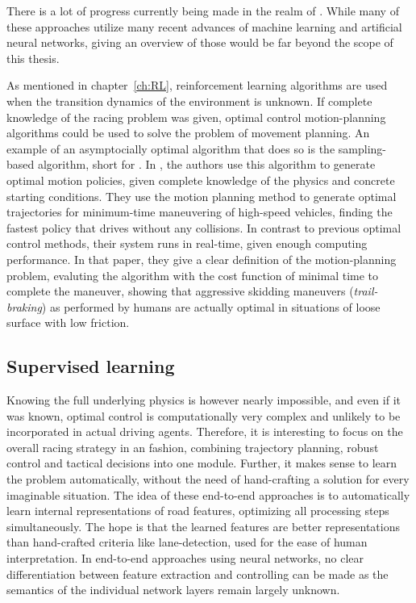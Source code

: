 There is a lot of progress currently being made in the realm of . While many of these approaches utilize many recent advances of machine learning and artificial neural networks, giving an overview of those would be far beyond the scope of this thesis.

As mentioned in chapter~\ref{ch:RL}, reinforcement learning algorithms are used when the transition dynamics of the environment is unknown. If complete knowledge of the racing problem was given, optimal control motion-planning algorithms could be used to solve the problem of movement planning. An example of an asymptocially optimal algorithm that does so is the sampling-based  algorithm, short for . In \cite{hwan_jeon_anytime_2011}, the authors use this algorithm to generate optimal motion policies, given complete knowledge of the physics and concrete starting conditions. They use the motion planning method to generate optimal trajectories for minimum-time maneuvering of high-speed vehicles, finding the fastest policy that drives without any collisions. In contrast to previous optimal control methods, their system runs in real-time, given enough computing performance. In that paper, they give a clear definition of the motion-planning problem, evaluting the algorithm with the cost function of minimal time to complete the maneuver, showing that aggressive skidding maneuvers (\textit{trail-braking}) as performed by humans are actually optimal in situations of loose surface with low friction.

\subsection{Supervised learning}

Knowing the full underlying physics is however nearly impossible, and even if it was known, optimal control is computationally very complex and unlikely to be incorporated in actual driving agents. Therefore, it is interesting to focus on the overall racing strategy in an  fashion, combining trajectory planning, robust control and tactical decisions into one module. Further, it makes sense to learn the problem automatically, without the need of hand-crafting a solution for every imaginable situation. The idea of these end-to-end approaches is to automatically learn internal representations of road features, optimizing all processing steps simultaneously. The hope is that the learned features are better representations than hand-crafted criteria like lane-detection, used for the ease of human interpretation. In end-to-end approaches using neural networks, no clear differentiation between feature extraction and controlling can be made as the semantics of the individual network layers remain largely unknown.

